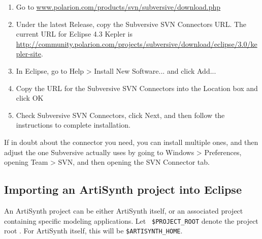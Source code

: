 \begin{enumerate}

\item  Go to 
\href{http://www.polarion.com/products/svn/subversive/download.php}
{www.polarion.com/products/svn/subversive/download.php}

\item Under the latest {\sf Release}, copy the Subversive SVN
Connectors URL. The current URL for Eclipse 4.3 Kepler
is \href{http://community.polarion.com/projects/subversive/download/eclipse/3.0/kepler-site/}
{http://community.polarion.com/projects/subversive/download/eclipse/3.0/kepler-site}.

\item In Eclipse, go to {\sf Help > Install New Software...} and 
click {\sf Add...}  

\item Copy the URL for the Subversive SVN Connectors into the {\sf
Location} box and click {\sf OK}

\item Check {\sf Subversive SVN Connectors}, click {\sf Next}, and
then follow the instructions to complete installation.

\end{enumerate}

If in doubt about the connector you need, you can install multiple
ones, and then adjust the one Subversive actually uses by going to
{\sf Windows > Preferences}, opening {\sf Team > SVN}, and then
opening the {\sf SVN Connector} tab.

\subsection{Importing an ArtiSynth project into Eclipse}
\label{importingArtisynth}

An ArtiSynth project can be either ArtiSynth itself, or an associated
project containing specific modeling applications. Let {\tt
\$PROJECT\_ROOT} denote the project root \directory. For ArtiSynth
itself, this will be {\tt \$ARTISYNTH\_HOME}.

